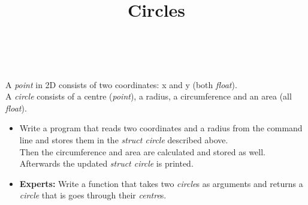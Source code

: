 

\title{Circles} %
\author{} %
\renewcommand{\difficulty}{Hard} %
\renewcommand{\requirements}{Structs} %
\renewcommand{\aims}{Working with structs} %


 \maketitle
 \taskinfos

\ \\\ \\
A \textit{point} in 2D consists of two coordinates: x and y (both \textit{float}). \\
A \textit{circle} consists of a centre (\textit{point}), a radius, a circumference and an area (all \textit{float}).
\begin{itemize}
	\item Write a program that reads two coordinates and a radius from the command line and stores them in the \textit{struct circle} described above.
	\\Then the circumference and area are calculated and stored as well.
	\\ Afterwards the updated \textit{struct circle} is printed.
	\item \textbf{Experts:} Write a function that takes two \textit{circle}s as arguments and returns a \textit{circle} that is goes through their \textit{centre}s.
\end{itemize}
 
 

